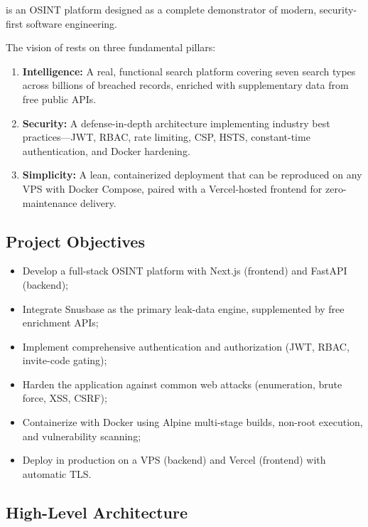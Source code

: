 \leaklens{} is an OSINT platform designed as a complete demonstrator of
modern, security-first software engineering.

The vision of \leaklens{} rests on three fundamental pillars:

\begin{enumerate}[nosep]
  \item \textbf{Intelligence:} A real, functional search platform covering
        seven search types across billions of breached records, enriched with
        supplementary data from free public APIs.
  \item \textbf{Security:} A defense-in-depth architecture implementing
        industry best practices---JWT, RBAC, rate limiting, CSP, HSTS,
        constant-time authentication, and Docker hardening.
  \item \textbf{Simplicity:} A lean, containerized deployment that can be
        reproduced on any VPS with Docker Compose, paired with a
        Vercel-hosted frontend for zero-maintenance delivery.
\end{enumerate}

\subsection{Project Objectives}

\begin{itemize}[nosep]
  \item Develop a full-stack OSINT platform with Next.js (frontend) and
        FastAPI (backend);
  \item Integrate Snusbase as the primary leak-data engine, supplemented
        by free enrichment APIs;
  \item Implement comprehensive authentication and authorization (JWT,
        RBAC, invite-code gating);
  \item Harden the application against common web attacks (enumeration,
        brute force, XSS, CSRF);
  \item Containerize with Docker using Alpine multi-stage builds, non-root
        execution, and vulnerability scanning;
  \item Deploy in production on a VPS (backend) and Vercel (frontend) with
        automatic TLS.
\end{itemize}

\subsection{High-Level Architecture}

